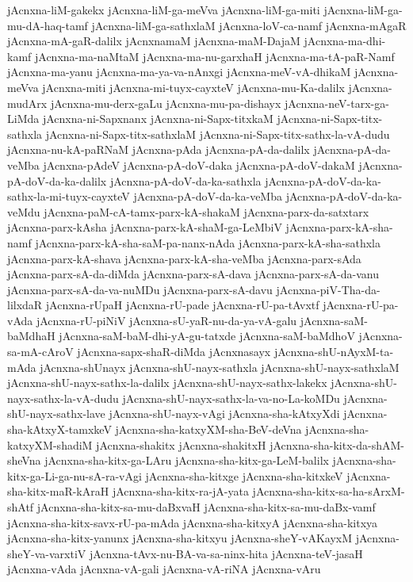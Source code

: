 {jAcnxna-liM-gakekx
jAcnxna-liM-ga-meVva
jAcnxna-liM-ga-miti
jAcnxna-liM-ga-mu-dA-haq-tamf
jAcnxna-liM-ga-sathxlaM
jAcnxna-loV-ca-namf
jAcnxna-mAgaR
jAcnxna-mA-gaR-dalilx
jAcnxnamaM
jAcnxna-maM-DajaM
jAcnxna-ma-dhi-kamf
jAcnxna-ma-naMtaM
jAcnxna-ma-nu-garxhaH
jAcnxna-ma-tA-paR-Namf
jAcnxna-ma-yanu
jAcnxna-ma-ya-va-nAnxgi
jAcnxna-meV-vA-dhikaM
jAcnxna-meVva
jAcnxna-miti
jAcnxna-mi-tuyx-cayxteV
jAcnxna-mu-Ka-dalilx
jAcnxna-mudArx
jAcnxna-mu-derx-gaLu
jAcnxna-mu-pa-dishayx
jAcnxna-neV-tarx-ga-LiMda
jAcnxna-ni-Sapxnanx
jAcnxna-ni-Sapx-titxkaM
jAcnxna-ni-Sapx-titx-sathxla
jAcnxna-ni-Sapx-titx-sathxlaM
jAcnxna-ni-Sapx-titx-sathx-la-vA-dudu
jAcnxna-nu-kA-paRNaM
jAcnxna-pAda
jAcnxna-pA-da-dalilx
jAcnxna-pA-da-veMba
jAcnxna-pAdeV
jAcnxna-pA-doV-daka
jAcnxna-pA-doV-dakaM
jAcnxna-pA-doV-da-ka-dalilx
jAcnxna-pA-doV-da-ka-sathxla
jAcnxna-pA-doV-da-ka-sathx-la-mi-tuyx-cayxteV
jAcnxna-pA-doV-da-ka-veMba
jAcnxna-pA-doV-da-ka-veMdu
jAcnxna-paM-cA-tamx-parx-kA-shakaM
jAcnxna-parx-da-satxtarx
jAcnxna-parx-kAsha
jAcnxna-parx-kA-shaM-ga-LeMbiV
jAcnxna-parx-kA-sha-namf
jAcnxna-parx-kA-sha-saM-pa-nanx-nAda
jAcnxna-parx-kA-sha-sathxla
jAcnxna-parx-kA-shava
jAcnxna-parx-kA-sha-veMba
jAcnxna-parx-sAda
jAcnxna-parx-sA-da-diMda
jAcnxna-parx-sA-dava
jAcnxna-parx-sA-da-vanu
jAcnxna-parx-sA-da-va-nuMDu
jAcnxna-parx-sA-davu
jAcnxna-piV-Tha-da-lilxdaR
jAcnxna-rUpaH
jAcnxna-rU-pade
jAcnxna-rU-pa-tAvxtf
jAcnxna-rU-pa-vAda
jAcnxna-rU-piNiV
jAcnxna-sU-yaR-nu-da-ya-vA-galu
jAcnxna-saM-baMdhaH
jAcnxna-saM-baM-dhi-yA-gu-tatxde
jAcnxna-saM-baMdhoV
jAcnxna-sa-mA-cAroV
jAcnxna-sapx-shaR-diMda
jAcnxnasayx
jAcnxna-shU-nAyxM-ta-mAda
jAcnxna-shUnayx
jAcnxna-shU-nayx-sathxla
jAcnxna-shU-nayx-sathxlaM
jAcnxna-shU-nayx-sathx-la-dalilx
jAcnxna-shU-nayx-sathx-lakekx
jAcnxna-shU-nayx-sathx-la-vA-dudu
jAcnxna-shU-nayx-sathx-la-va-no-La-koMDu
jAcnxna-shU-nayx-sathx-lave
jAcnxna-shU-nayx-vAgi
jAcnxna-sha-kAtxyXdi
jAcnxna-sha-kAtxyX-tamxkeV
jAcnxna-sha-katxyXM-sha-BeV-deVna
jAcnxna-sha-katxyXM-shadiM
jAcnxna-shakitx
jAcnxna-shakitxH
jAcnxna-sha-kitx-da-shAM-sheVna
jAcnxna-sha-kitx-ga-LAru
jAcnxna-sha-kitx-ga-LeM-balilx
jAcnxna-sha-kitx-ga-Li-ga-nu-sA-ra-vAgi
jAcnxna-sha-kitxge
jAcnxna-sha-kitxkeV
jAcnxna-sha-kitx-maR-kAraH
jAcnxna-sha-kitx-ra-jA-yata
jAcnxna-sha-kitx-sa-ha-sArxM-shAtf
jAcnxna-sha-kitx-sa-mu-daBxvaH
jAcnxna-sha-kitx-sa-mu-daBx-vamf
jAcnxna-sha-kitx-savx-rU-pa-mAda
jAcnxna-sha-kitxyA
jAcnxna-sha-kitxya
jAcnxna-sha-kitx-yanunx
jAcnxna-sha-kitxyu
jAcnxna-sheY-vAKayxM
jAcnxna-sheY-va-varxtiV
jAcnxna-tAvx-nu-BA-va-sa-ninx-hita
jAcnxna-teV-jasaH
jAcnxna-vAda
jAcnxna-vA-gali
jAcnxna-vA-riNA
jAcnxna-vAru
}
